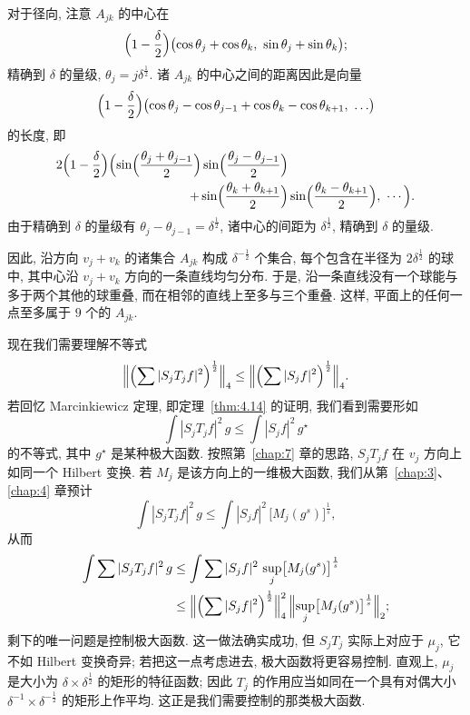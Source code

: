 对于径向, 注意 $A_{jk}$ 的中心在
\[
\Bigl(1-\frac{\delta}{2}\Bigr)\bigl(\cos\theta_{j}+\cos\theta_{k},\ \sin\theta_{j}+\sin\theta_{k}\bigr);
\]
精确到 $\delta$ 的量级, $\theta_j=j\delta^{\frac{1}{2}}$. 诸 $A_{jk}$ 的中心之间的距离因此是向量
\[
\Bigl(1-\frac{\delta}{2}\Bigr)\bigl(\cos\theta_{j}-\cos\theta_{j-1}+\cos\theta_{k}-\cos\theta_{k+1},\ \ldots\bigr)
\]
的长度, 即
\begin{align*}
2\Bigl(1-\frac{\delta}{2}\Bigr)\Bigl(\sin\Bigl(\frac{\theta_{j}+\theta_{j-1}}{2}\Bigr)\sin\Bigl(\frac{\theta_{j}-\theta_{j-1}}{2}\Bigr)&\\
+\sin\Bigl(\frac{\theta_{k}+\theta_{k+1}}{2}\Bigr)&\sin\Bigl(\frac{\theta_{k}-\theta_{k+1}}{2}\Bigr),\ \cdots\Bigr).
\end{align*}
由于精确到 $\delta$ 的量级有 $\theta_j-\theta_{j-1}=\delta^{\frac{1}{2}}$, 诸中心的间距为 $\delta^{\frac{1}{2}}$, 精确到 $\delta$ 的量级.

因此, 沿方向 $v_j+v_k$ 的诸集合 $A_{jk}$ 构成 $\delta^{-\frac{1}{2}}$ 个集合, 每个包含在半径为 $2\delta^{\frac{1}{2}}$ 的球中, 其中心沿 $v_j+v_k$ 方向的一条直线均匀分布. 于是, 沿一条直线没有一个球能与多于两个其他的球重叠, 而在相邻的直线上至多与三个重叠. 这样, 平面上的任何一点至多属于 $9$ 个的 $A_{jk}$.

现在我们需要理解不等式
\[
\Bigl\|\Bigl(\sum|S_{j}T_{j}f|^{2}\Bigr)^{\frac{1}{2}}\Bigr\|_{4}
\leq\Bigl\|\Bigl(\sum|S_{j}f|^{2}\Bigr)^{\frac{1}{2}}\Bigr\|_{4}.
\]
若回忆 Marcinkiewicz 定理, 即定理~\ref{thm:4.14} 的证明, 我们看到需要形如
\[
\int|S_{j}T_{j}f|^{2}\,g\leq\int|S_{j}f|^{2}\,g^{\star}
\]
的不等式, 其中 $g^{\star}$ 是某种极大函数. 按照第~\ref{chap:7} 章的思路, $S_jT_jf$ 在 $v_j$ 方向上如同一个 Hilbert 变换. 若 $M_j$ 是该方向上的一维极大函数, 我们从第~\ref{chap:3}、\ref{chap:4} 章预计
\[
\int|S_{j}T_{j}f|^{2}\,g\leq\int|S_{j}f|^{2}\,\bigl[M_{j}(g^{s})\bigr]^{\frac{1}{s}},
\]
从而
\begin{align*}
\int\sum|S_{j}T_{j}f|^{2}\,g
&\leq\int\sum|S_{j}f|^{2}\,\sup_{j}\bigl[M_{j}(g^{s})\bigr]^{\frac{1}{s}} \\
&\leq\Bigl\|\Bigl(\sum|S_{j}f|^{2}\Bigr)^{\frac{1}{2}}\Bigr\|_{4}^{2}\,
\Bigl\|\sup_{j}\bigl[M_{j}(g^{s})\bigr]^{\frac{1}{s}}\Bigr\|_{2};
\end{align*}
剩下的唯一问题是控制极大函数. 这一做法确实成功, 但 $S_jT_j$ 实际上对应于 $\mu_j$, 它不如 Hilbert 变换奇异; 若把这一点考虑进去, 极大函数将更容易控制. 直观上, $\mu_j$ 是大小为 $\delta\times\delta^{\frac{1}{2}}$ 的矩形的特征函数; 因此 $T_j$ 的作用应当如同在一个具有对偶大小 $\delta^{-1}\times\delta^{-\frac{1}{2}}$ 的矩形上作平均. 这正是我们需要控制的那类极大函数.

